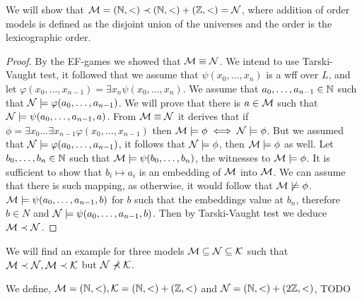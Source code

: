 \subquestion{}
We will show that $\mathcal{M} = (\mathbb{N}, <) \prec (\mathbb{N}, <) + (\mathbb{Z}, <) = \mathcal{N}$, where addition of order models is defined as the disjoint union of the universes and the order is the lexicographic order.
\begin{proof}
	By the EF-games we showed that $\mathcal{M} \equiv \mathcal{N}$.
	We intend to use Tarski-Vaught test, it followed that we assume that $\psi(x_0, \dots, x_n)$ is a wff over $L$,
	and let $\varphi(x_0, \dots, x_{n - 1}) = \exists x_n \psi(x_0, \dots, x_n)$.
	We assume that $a_0, \dots, a_{n - 1} \in \mathbb{N}$ such that $\mathcal{N} \models \varphi(a_0, \dots, a_{n - 1})$.
	We will prove that there is $a \in \mathcal{M}$ such that $\mathcal{N} \models \psi(a_0, \dots, a_{n - 1}, a)$.
	From $\mathcal{M} \equiv \mathcal{N}$ it derives that if $\phi = \exists x_0 \dots \exists x_{n - 1} \varphi(x_0, \dots, x_{n - 1})$ then $\mathcal{M} \models \phi \iff \mathcal{N} \models \phi$.
	But we assumed that $\mathcal{N} \models \varphi(a_0, \dots, a_{n - 1})$, it follows that $\mathcal{N} \models \phi$, then $\mathcal{M} \models \phi$ as well.
	Let $b_0, \dots, b_n \in \mathbb{N}$ such that $\mathcal{M} \models \psi(b_0, \dots, b_n)$, the witnesses to $\mathcal{M} \models \phi$.
	It is sufficient to show that $b_i \mapsto a_i$ is an embedding of $\mathcal{M}$ into $\mathcal{M}$.
	We can assume that there is such mapping, as otherwise, it would follow that $\mathcal{M} \not\models \phi$.
	$\mathcal{M} \models \psi(a_0, \dots, a_{n - 1}, b)$ for $b$ such that the embeddings value at $b_n$, therefore $b \in N$ and $\mathcal{N} \models \psi(a_0, \dots, a_{n - 1}, b)$.
	Then by Tarski-Vaught test we deduce $\mathcal{M} \prec \mathcal{N}$.
\end{proof}

\subquestion{}
We will find an example for three models $\mathcal{M} \subseteq \mathcal{N} \subseteq \mathcal{K}$ such that $\mathcal{M} \prec \mathcal{N}, \mathcal{M} \prec \mathcal{K}$ but $\mathcal{N} \not\prec \mathcal{K}$.
\begin{solution}
	We define, $\mathcal{M} = (\mathbb{N}, <), \mathcal{K} = (\mathbb{N}, <) + (\mathbb{Z}, <)$ and $\mathcal{N} = (\mathbb{N}, <) + (2\mathbb{Z}, <)$,
	TODO
\end{solution}


